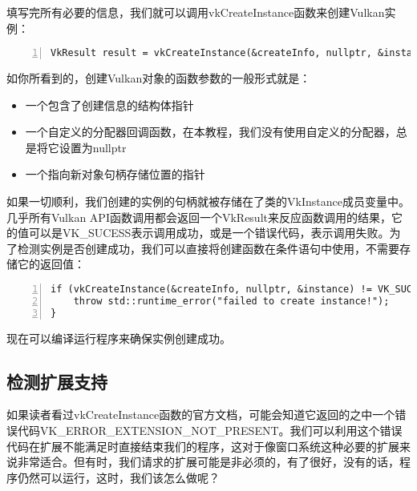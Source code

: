 \documentclass{ctexart}
\begin{document}
填写完所有必要的信息，我们就可以调用vkCreateInstance函数来创建Vulkan实例：

\begin{lstlisting}[language={[ANSI]C},keywordstyle=\color{blue!70},commentstyle=\color{red!50!green!50!blue!50},frame=shadowbox, rulesepcolor=\color{red!20!green!20!blue!20},basicstyle=\small,numbers=left, numberstyle=\tiny,breaklines=true]
VkResult result = vkCreateInstance(&createInfo, nullptr, &instance);
\end{lstlisting}

如你所看到的，创建Vulkan对象的函数参数的一般形式就是：

\begin{itemize}
	\item 一个包含了创建信息的结构体指针
	\item 一个自定义的分配器回调函数，在本教程，我们没有使用自定义的分配器，总是将它设置为nullptr
	\item 一个指向新对象句柄存储位置的指针
\end{itemize}

如果一切顺利，我们创建的实例的句柄就被存储在了类的VkInstance成员变量中。几乎所有Vulkan API函数调用都会返回一个VkResult来反应函数调用的结果，它的值可以是VK\_SUCESS表示调用成功，或是一个错误代码，表示调用失败。为了检测实例是否创建成功，我们可以直接将创建函数在条件语句中使用，不需要存储它的返回值：

\begin{lstlisting}[language={[ANSI]C},keywordstyle=\color{blue!70},commentstyle=\color{red!50!green!50!blue!50},frame=shadowbox, rulesepcolor=\color{red!20!green!20!blue!20},basicstyle=\small,numbers=left, numberstyle=\tiny,breaklines=true]
if (vkCreateInstance(&createInfo, nullptr, &instance) != VK_SUCCESS) {
	throw std::runtime_error("failed to create instance!");
}
\end{lstlisting}

现在可以编译运行程序来确保实例创建成功。

\subsection{检测扩展支持}

如果读者看过vkCreateInstance函数的官方文档，可能会知道它返回的之中一个错误代码VK\_ERROR\_EXTENSION\_NOT\_PRESENT。我们可以利用这个错误代码在扩展不能满足时直接结束我们的程序，这对于像窗口系统这种必要的扩展来说非常适合。但有时，我们请求的扩展可能是非必须的，有了很好，没有的话，程序仍然可以运行，这时，我们该怎么做呢？
\end{document}
